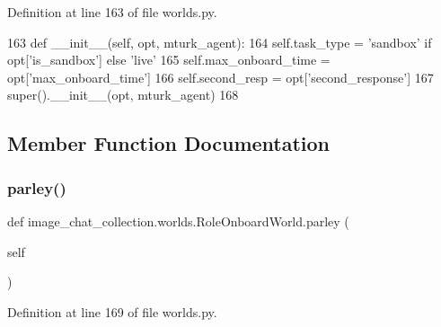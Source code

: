 Definition at line 163 of file worlds.\+py.


\begin{DoxyCode}
163     \textcolor{keyword}{def }\_\_init\_\_(self, opt, mturk\_agent):
164         self.task\_type = \textcolor{stringliteral}{'sandbox'} \textcolor{keywordflow}{if} opt[\textcolor{stringliteral}{'is\_sandbox'}] \textcolor{keywordflow}{else} \textcolor{stringliteral}{'live'}
165         self.max\_onboard\_time = opt[\textcolor{stringliteral}{'max\_onboard\_time'}]
166         self.second\_resp = opt[\textcolor{stringliteral}{'second\_response'}]
167         super().\_\_init\_\_(opt, mturk\_agent)
168 
\end{DoxyCode}


\subsection{Member Function Documentation}
\mbox{\label{classimage__chat__collection_1_1worlds_1_1RoleOnboardWorld_a6ce045008b106b6a610770d18ea7c7da}} 
\subsubsection{\texorpdfstring{parley()}{parley()}}
{\footnotesize\ttfamily def image\+\_\+chat\+\_\+collection.\+worlds.\+Role\+Onboard\+World.\+parley (\begin{DoxyParamCaption}\item[{}]{self }\end{DoxyParamCaption})}



Definition at line 169 of file worlds.\+py.


